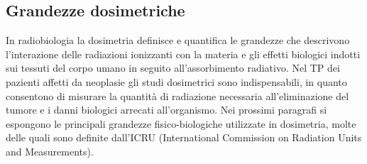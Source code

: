 \documentclass[12pt,a4paper,twoside]{report}
\begin{document}
	\subsection{Grandezze dosimetriche}
	In radiobiologia la dosimetria definisce e quantifica le grandezze che descrivono l'interazione delle radiazioni ionizzanti con la materia e gli effetti biologici indotti sui tessuti del corpo umano in seguito all'assorbimento radiativo. Nel TP dei pazienti affetti da neoplasie gli studi dosimetrici sono indispensabili, in quanto consentono di misurare la quantità di radiazione necessaria all'eliminazione del tumore e i danni biologici arrecati all'organismo. Nei prossimi paragrafi si espongono le principali grandezze fisico-biologiche utilizzate in dosimetria, molte delle quali sono definite dall'ICRU (International Commission on Radiation Units and Measurements).
	
\end{document}
